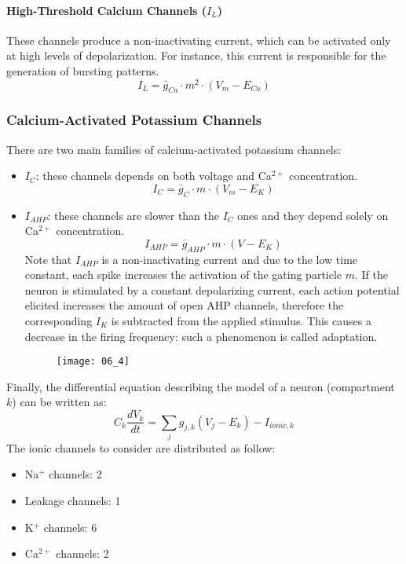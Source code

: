\paragraph{High-Threshold Calcium Channels (\(I_{L}\))} These channels produce a
non-inactivating current, which can be activated only at high levels of depolarization.
For instance, this current is responsible for the generation of bursting patterns.
\begin{equation*}
    I_{L}=\bar{g}_{Ca}\cdot{m^{2}}\cdot{(V_{m}-E_{Ca})}
\end{equation*}
\subsubsection{Calcium-Activated Potassium Channels}
There are two main families of calcium-activated potassium channels:
\begin{itemize}
    \item \textbf{\(I_{C}\)}: these channels depends on both voltage and Ca\({}^{2+}\)
          concentration.
          \begin{equation*}
              I_{C}=\bar{g}_{C}\cdot{m}\cdot{(V_{m}-E_{K})}
          \end{equation*}
    \item \textbf{\(I_{AHP}\)}: these channels are slower than the \(I_{C}\) ones and they
          depend solely on Ca\({}^{2+}\) concentration.
          \begin{equation*}
              I_{AHP}=\bar{g}_{AHP}\cdot{m}\cdot{(V-E_{K})}
          \end{equation*}
          Note that \(I_{AHP}\) is a non-inactivating current and due to the low time constant,
          each spike increases the activation of the gating particle \(m\). If the neuron is
          stimulated by a constant depolarizing current, each action potential elicited increases
          the amount of open AHP channels, therefore the corresponding  \(I_{K}\) is
          subtracted from the applied stimulus. This causes a decrease in the firing frequency:
          such a phenomenon is called adaptation.
          \begin{figure}[H]
              \texttt{[image: 06\_4]}
              \centering
          \end{figure}
\end{itemize}
Finally, the differential equation describing the model of a neuron (compartment \(k\))
can be written as:
\begin{equation*}
    C_{k}\frac{dV_{k}}{dt}=\sum_{j}g_{j,k}(V_{j}-E_{k})-I_{ionic,k}
\end{equation*}
The ionic channels to consider are distributed as follow:
\begin{itemize}
    \item Na\({}^{+}\) channels: 2
    \item Leakage channels: 1
    \item K\({}^{+}\) channels: 6
    \item Ca\({}^{2+}\) channels: 2
\end{itemize}

